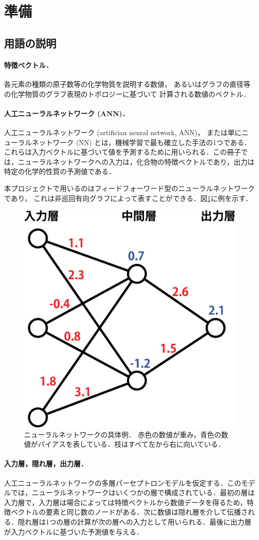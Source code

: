 \documentclass[11pt, titlepage, dvipdfmx, twoside]{jarticle}
\newcommand{\figref}[1]{図\ref{fig:#1}}
\begin{document}
\section{準備}
\label{sec:preparation}

\subsection{用語の説明}
\paragraph{特徴ベクトル．}
各元素の種類の原子数等の化学物質を説明する数値，
あるいはグラフの直径等の化学物質のグラフ表現のトポロジーに基づいて
計算される数値のベクトル．

\paragraph{人工ニューラルネットワーク (ANN)．}
人工ニューラルネットワーク (artifician neural network, ANN)，
または単にニューラルネットワーク (NN) とは，機械学習で最も確立した手法の1つである．これらは入力ベクトルに基づいて値を予測するために用いられる．この冊子では，ニューラルネットワークへの入力は，化合物の特徴ベクトルであり，出力は特定の化学的性質の予測値である．

本プロジェクトで用いるのはフィードフォーワード型のニューラルネットワークであり，
これは非巡回有向グラフによって表すことができる．\figref{sample}に例を示す．

\begin{figure}[h!]
  \centering
  \includegraphics[width = 0.4 \textwidth]{./fig/ANN_sample_jp}
  \caption{ニューラルネットワークの具体例．
  赤色の数値が重み，青色の数値がバイアスを表している．枝はすべて左から右に向いている．}
  \label{fig:sample}
\end{figure}

\paragraph{入力層，隠れ層，出力層．}
人工ニューラルネットワークの多層パーセプトロンモデルを仮定する．このモデルでは，ニューラルネットワークはいくつかの層で構成されている．最初の層は入力層で，入力層は場合によっては特徴ベクトルから数値データを得るため，特徴ベクトルの要素と同じ数のノードがある．次に数値は隠れ層を介して伝播される．隠れ層は1つの層の計算が次の層への入力として用いられる．最後に出力層が入力ベクトルに基づいた予測値を与える．
\end{document}
